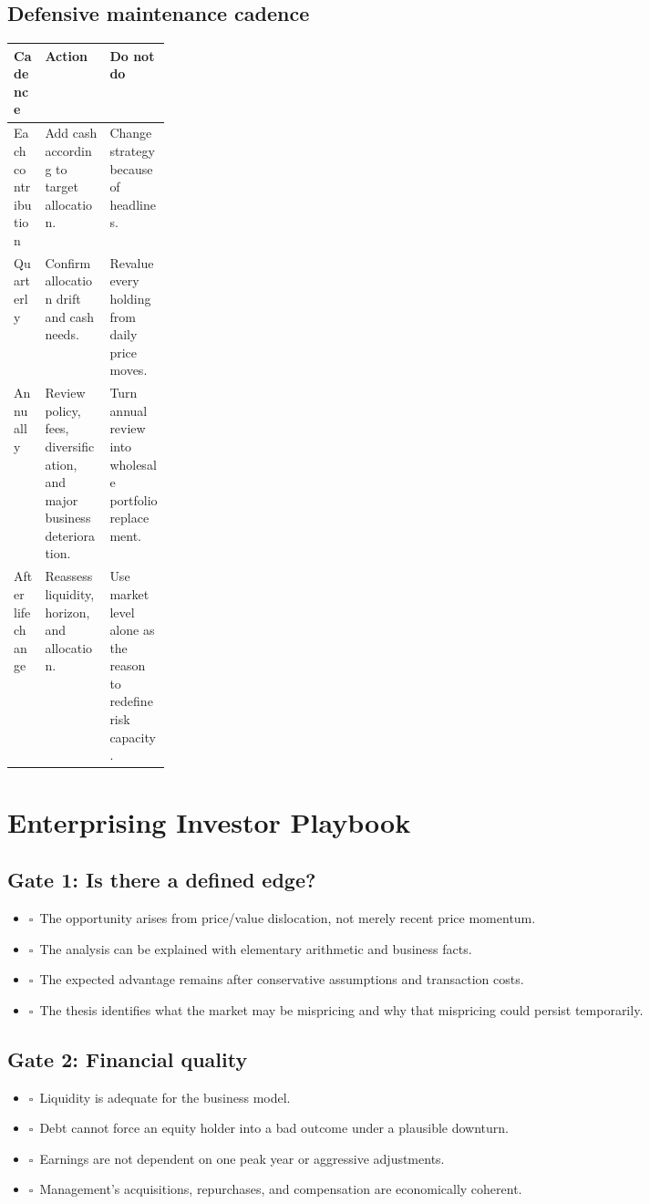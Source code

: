 \documentclass[11pt]{article}
\newcommand{\checkbox}{\(\square\)}
\begin{document}
\subsection{Defensive maintenance cadence}
\begin{center}
\begin{tabularx}{\linewidth}{@{}p{0.20\linewidth}Y Y@{}}
\toprule
\textbf{Cadence} & \textbf{Action} & \textbf{Do not do}\\
\midrule
Each contribution & Add cash according to target allocation. & Change strategy because of headlines.\\
Quarterly & Confirm allocation drift and cash needs. & Revalue every holding from daily price moves.\\
Annually & Review policy, fees, diversification, and major business deterioration. & Turn annual review into wholesale portfolio replacement.\\
After life change & Reassess liquidity, horizon, and allocation. & Use market level alone as the reason to redefine risk capacity.\\
\bottomrule
\end{tabularx}
\end{center}

\section{Enterprising Investor Playbook}
\subsection{Gate 1: Is there a defined edge?}
\begin{itemize}
\item \checkbox\ The opportunity arises from price/value dislocation, not merely recent price momentum.
\item \checkbox\ The analysis can be explained with elementary arithmetic and business facts.
\item \checkbox\ The expected advantage remains after conservative assumptions and transaction costs.
\item \checkbox\ The thesis identifies what the market may be mispricing and why that mispricing could persist temporarily.
\end{itemize}

\subsection{Gate 2: Financial quality}
\begin{itemize}
\item \checkbox\ Liquidity is adequate for the business model.
\item \checkbox\ Debt cannot force an equity holder into a bad outcome under a plausible downturn.
\item \checkbox\ Earnings are not dependent on one peak year or aggressive adjustments.
\item \checkbox\ Management's acquisitions, repurchases, and compensation are economically coherent.
\end{itemize}
\end{document}
